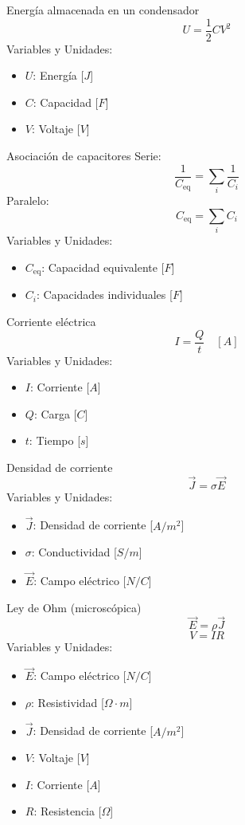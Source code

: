 \documentclass{article}
\begin{document}
\begin{multicols}{3}
\begin{teorema}{Energía almacenada en un condensador}
    $$U = \frac{1}{2} C V^2$$
    Variables y Unidades:
    \begin{itemize}
        \item $U$: Energía [$J$]
        \item $C$: Capacidad [$F$]
        \item $V$: Voltaje [$V$]
    \end{itemize}
\end{teorema}

\begin{teorema}{Asociación de capacitores}
    Serie: $$\frac{1}{C_{\text{eq}}} = \sum_i \frac{1}{C_i}$$
    Paralelo: $$C_{\text{eq}} = \sum_i C_i$$
    Variables y Unidades:
    \begin{itemize}
        \item $C_{\text{eq}}$: Capacidad equivalente [$F$]
        \item $C_i$: Capacidades individuales [$F$]
    \end{itemize}
\end{teorema}

\columnbreak

\begin{teorema}{Corriente eléctrica}
    $$ I = \frac{Q}{t} \quad [A]$$
    Variables y Unidades:
    \begin{itemize}
        \item $I$: Corriente [$A$]
        \item $Q$: Carga [$C$]
        \item $t$: Tiempo [$s$]
    \end{itemize}
\end{teorema}

\begin{teorema}{Densidad de corriente}
    $$\vec{J} = \sigma \vec{E}$$
    Variables y Unidades:
    \begin{itemize}
        \item $\vec{J}$: Densidad de corriente [$A/m^2$]
        \item $\sigma$: Conductividad [$S/m$]
        \item $\vec{E}$: Campo eléctrico [$N/C$]
    \end{itemize}
\end{teorema}

\begin{teorema}{Ley de Ohm (microscópica)}
    $$\vec{E} = \rho \vec{J}$$
    $$V = IR$$
    Variables y Unidades:
    \begin{itemize}
        \item $\vec{E}$: Campo eléctrico [$N/C$]
        \item $\rho$: Resistividad [$\Omega \cdot m$]
        \item $\vec{J}$: Densidad de corriente [$A/m^2$]
        \item $V$: Voltaje [$V$]
        \item $I$: Corriente [$A$]
        \item $R$: Resistencia [$\Omega$]
    \end{itemize}
\end{teorema}


\end{multicols}
\end{document}
